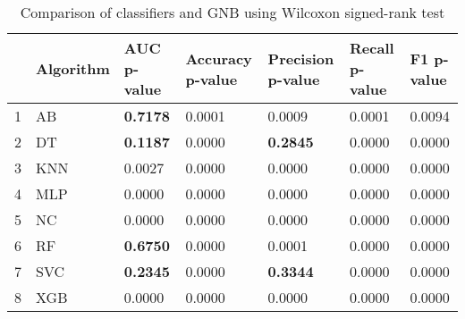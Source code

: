 \begin{table}
\footnotesize
\caption{Comparison of classifiers and GNB using Wilcoxon signed-rank test}
\label{tab:wilcoxon comparison}
\begin{tabular}{lllllll}
\hline
 & Algorithm & AUC p-value & Accuracy p-value & Precision p-value & Recall p-value & F1 p-value \\
\hline
1 & AB & \textbf{0.7178} & 0.0001 & 0.0009 & 0.0001 & 0.0094 \\
2 & DT & \textbf{0.1187} & 0.0000 & \textbf{0.2845} & 0.0000 & 0.0000 \\
3 & KNN & 0.0027 & 0.0000 & 0.0000 & 0.0000 & 0.0000 \\
4 & MLP & 0.0000 & 0.0000 & 0.0000 & 0.0000 & 0.0000 \\
5 & NC & 0.0000 & 0.0000 & 0.0000 & 0.0000 & 0.0000 \\
6 & RF & \textbf{0.6750} & 0.0000 & 0.0001 & 0.0000 & 0.0000 \\
7 & SVC & \textbf{0.2345} & 0.0000 & \textbf{0.3344} & 0.0000 & 0.0000 \\
8 & XGB & 0.0000 & 0.0000 & 0.0000 & 0.0000 & 0.0000 \\
\hline
\end{tabular}
\end{table}
